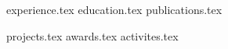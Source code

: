 \documentclass[letterpaper,11pt]{article}
\begin{document}
\header{\nameFull}{
    \emailLink{\email} \\
    \websiteLink{\website} \\
    \githubLink{\github} \\
    \linkedinLink{\linkedin}
}

\resumeDescription

{experience.tex}
{education.tex}
{publications.tex}

{projects.tex}
{awards.tex}
{activites.tex}


\end{document}
